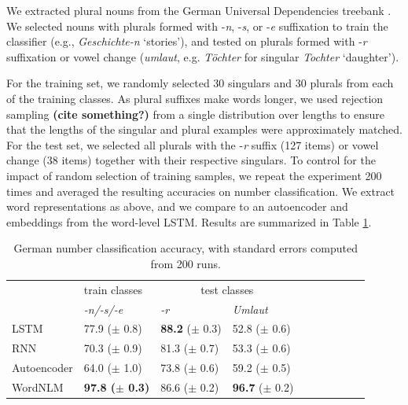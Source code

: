 We extracted plural nouns from the German Universal Dependencies
treebank \cite{de2006generating,mcdonald2013universal}.  We selected
nouns with plurals formed with -\emph{n}, -\emph{s}, or -\emph{e}
suffixation to train the classifier (e.g., \emph{Geschichte-n} `stories'), and tested on plurals formed with
-\emph{r} suffixation or vowel change (\emph{umlaut}, e.g. \emph{T{\"o}chter} for singular \emph{Tochter} `daughter').

For the training set, we randomly selected 30 singulars and 30 plurals
from each of the training classes.  As plural suffixes make words
longer, we used rejection sampling \textbf{(cite something?)} from a
single distribution over lengths to ensure that the lengths of the
singular and plural examples were approximately matched.  For the test
set, we selected all plurals with the -\emph{r} suffix (127 items) or vowel change (38 items)
together with their respective singulars. %
To
control for the impact of random selection of training samples, we
repeat the experiment 200 times and averaged the resulting accuracies
on number classification.  We extract word representations as above,
and we compare to an autoencoder and embeddings from the word-level
LSTM. Results are summarized in Table \ref{tab:number-results}.



\begin{table}[t]
  \begin{center}
    \begin{tabular}{l|l|l|lllllll}
      &train classes&\multicolumn{2}{|c}{test classes}\\
      &\emph{-n/-s/-e}&\emph{-r}&\emph{Umlaut}\\      \hline
	    LSTM& 77.9 ($\pm$ 0.8) & \textbf{88.2} ($\pm$ 0.3) & 52.8 ($\pm$ 0.6) \\
	    RNN& 70.3 ($\pm$ 0.9) & 81.3 ($\pm$ 0.7) & 53.3 ($\pm$ 0.6)\\
	    Autoencoder& 64.0 ($\pm$ 1.0) & 73.8 ($\pm$ 0.6) & 59.2 ($\pm$ 0.5)\\
	    WordNLM& \textbf{97.8 ($\pm$ 0.3)} & 86.6 ($\pm$ 0.2) & \textbf{96.7} ($\pm$ 0.2)  \\ %
    \end{tabular}
  \end{center}
	\caption{\label{tab:number-results} German number classification accuracy, with standard errors computed from 200 runs.}
\end{table}




